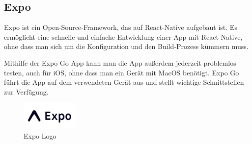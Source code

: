 \subsection{Expo}
\label{sec:expo}

Expo ist ein \Gls{Open-Source}-\Gls*{Framework}, das auf React-Native aufgebaut ist. Es ermöglicht eine schnelle und einfache Entwicklung einer App mit React Native, ohne dass man sich um die Konfiguration und den Build-Prozess kümmern muss. 

\noindent Mithilfe der Expo Go App kann man die App außerdem jederzeit problemlos testen, auch für iOS, ohne dass man ein Gerät mit MacOS benötigt. Expo Go führt die App auf dem verwendeten Gerät aus und stellt wichtige Schnittstellen zur Verfügung. 

\begin{figure}[H]
    \centering
    \includegraphics[width=0.25\textwidth]{images/expologo.png}
    \caption{Expo Logo }
    \label{fig:expo logo}
\end{figure}
